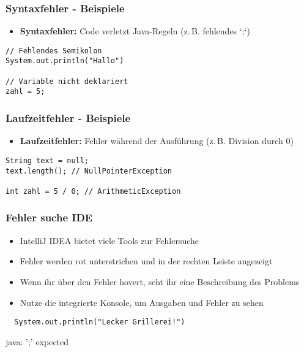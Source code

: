 \documentclass{../../presentation}
\begin{document}
\begin{frame}[fragile]
  \frametitle{Syntaxfehler - Beispiele}
  \pause
  \begin{itemize}
    \item \textbf{Syntaxfehler:} Code verletzt Java-Regeln (z.\,B. fehlendes `;`)
  \end{itemize}
  \begin{verbatim}
// Fehlendes Semikolon
System.out.println("Hallo")

// Variable nicht deklariert
zahl = 5;
  \end{verbatim}
\end{frame}

\begin{frame}[fragile]
  \frametitle{Laufzeitfehler - Beispiele}
  \begin{itemize}
    \item \textbf{Laufzeitfehler:} Fehler während der Ausführung (z.\,B. Division durch 0)
  \end{itemize}
  \begin{verbatim}
String text = null;
text.length(); // NullPointerException

int zahl = 5 / 0; // ArithmeticException
  \end{verbatim}
\end{frame}


\begin{frame}[fragile]
  \frametitle{Fehler suche IDE}
  \pause
  \begin{itemize}
    \item IntelliJ IDEA bietet viele Tools zur Fehlersuche
          \pause
    \item Fehler werden rot unterstrichen und in der rechten Leiste angezeigt
          \pause
    \item Wenn ihr über den Fehler hovert, seht ihr eine Beschreibung des Problems
          \pause
    \item Nutze die integrierte Konsole, um Ausgaben und Fehler zu sehen \newline
  \end{itemize}
  \begin{verbatim}
  System.out.println("Lecker Grillerei!")
  \end{verbatim}
  \pause
  \begin{ausgabe}
    \color{red}java: ';' expected
  \end{ausgabe}
\end{frame}
\end{document}
